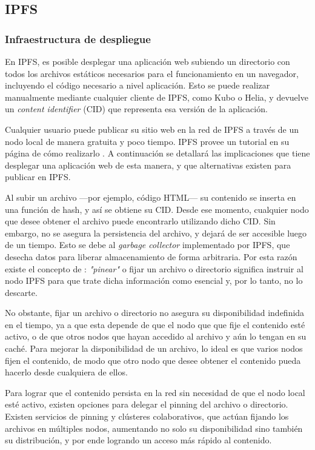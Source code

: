 \subsection{IPFS}

\subsubsection{Infraestructura de despliegue}

En IPFS, es posible desplegar una aplicación web subiendo un directorio con todos los archivos estáticos necesarios para el funcionamiento en un navegador, incluyendo el código necesario a nivel aplicación. Esto se puede realizar manualmente mediante cualquier cliente de IPFS, como Kubo\cite{kubo} o Helia\cite{helia}, y devuelve un \textit{content identifier} (CID) \cite{cid} que representa esa versión de la aplicación.

Cualquier usuario puede publicar su sitio web en la red de IPFS a través de un nodo local de manera gratuita y poco tiempo. IPFS provee un tutorial en su página de cómo realizarlo \cite{ipfs-static-website}. A continuación se detallará las implicaciones que tiene desplegar una aplicación web de esta manera, y que alternativas existen para publicar en IPFS.

Al subir un archivo —por ejemplo, código HTML— su contenido se inserta en una función de hash, y así se obtiene su CID. Desde ese momento, cualquier nodo que desee obtener el archivo puede encontrarlo utilizando dicho CID. Sin embargo, no se asegura la persistencia del archivo, y dejará de ser accesible luego de un tiempo. Esto se debe al \textit{garbage collector} \cite{garbage-collector} implementado por IPFS, que desecha datos para liberar almacenamiento de forma arbitraria. Por esta razón existe el concepto de \cite{pinning}: \textit{"pinear"} o fijar un archivo o directorio significa instruir al nodo IPFS para que trate dicha información como esencial y, por lo tanto, no lo descarte. 

No obstante, fijar un archivo o directorio no asegura su disponibilidad indefinida en el tiempo, ya a que esta depende de que el nodo que que fije el contenido esté activo, o de que otros nodos que hayan accedido al archivo y aún lo tengan en su caché. Para mejorar la disponibilidad de un archivo, lo ideal es que varios nodos fijen el contenido, de modo que otro nodo que desee obtener el contenido pueda hacerlo desde cualquiera de ellos.

Para lograr que el contenido persista en la red sin necesidad de que el nodo local esté activo, existen opciones para delegar el pinning del archivo o directorio. Existen servicios de pinning y clústeres colaborativos, que actúan fijando los archivos en múltiples nodos, aumentando no solo su disponibilidad sino también su distribución, y por ende logrando un acceso más rápido al contenido.

